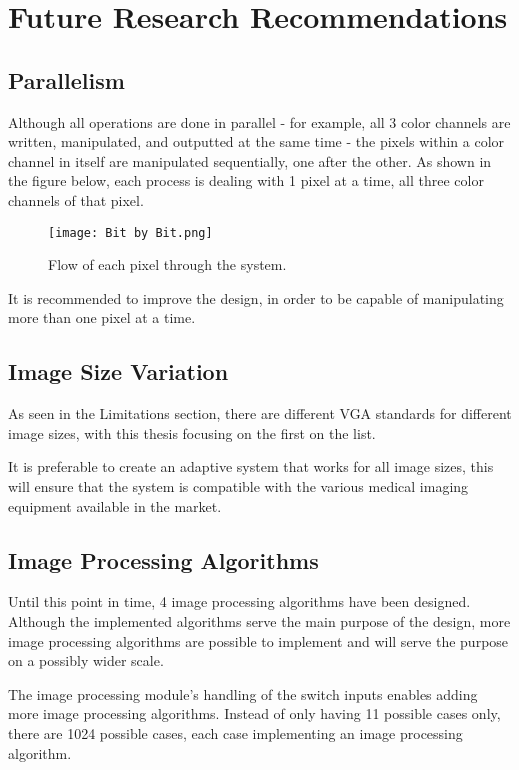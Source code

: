 \section{Future Research Recommendations}
\subsection{Parallelism}
\par Although all operations are done in parallel - for example, all 3 color channels are written, manipulated, and outputted at the same time - the pixels within a color channel in itself are manipulated sequentially, one after the other. As shown in the figure below, each process is dealing with 1 pixel at a time, all three color channels of that pixel. \newline

\begin{figure}[H]
	\centering
	\texttt{[image: Bit by Bit.png]}
	\caption{ Flow of each pixel through the system. }
	\label{fig:BitbyBit}  
\end{figure}

\par It is recommended to improve the design, in order to be capable of manipulating more than one pixel at a time. \newline

\subsection{Image Size Variation}
\par As seen in the Limitations section, there are different VGA standards for different image sizes, with this thesis focusing on the first on the list. \newline
\par It is preferable to create an adaptive system that works for all image sizes, this will ensure that the system is compatible with the various medical imaging equipment available in the market.  \newline

\subsection{Image Processing Algorithms}
\par Until this point in time, 4 image processing algorithms have been designed. Although the implemented algorithms serve the main purpose of the design, more image processing algorithms are possible to implement and will serve the purpose on a possibly wider scale. \newline
\par The image processing module's handling of the switch inputs enables adding more image processing algorithms. Instead of only having 11 possible cases only, there are 1024 possible cases, each case implementing an image processing algorithm. \newline

